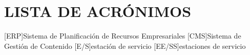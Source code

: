 \chapter*{LISTA DE ACRÓNIMOS}
\begin{acronym}
    [ERP]{Sistema de Planificación de Recursos Empresariales}
    [CMS]{Sistema de Gestión de Contenido}
    [E/S]{estación de servicio}
    [EE/SS]{estaciones de servicio}
\end{acronym}